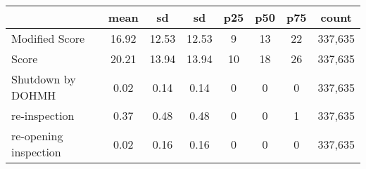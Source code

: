 {
\def\sym#1{\ifmmode^{#1}\else\(^{#1}\)\fi}
\begin{tabular}{l*{1}{ccccccc}}
\hline\hline
                    &        mean&          sd&          sd&         p25&         p50&         p75&       count\\
\hline
Modified Score      &       16.92&       12.53&       12.53&           9&          13&          22&     337,635\\
Score               &       20.21&       13.94&       13.94&          10&          18&          26&     337,635\\
Shutdown by DOHMH   &        0.02&        0.14&        0.14&           0&           0&           0&     337,635\\
re-inspection       &        0.37&        0.48&        0.48&           0&           0&           1&     337,635\\
re-opening inspection&        0.02&        0.16&        0.16&           0&           0&           0&     337,635\\
\hline\hline
\end{tabular}
}
